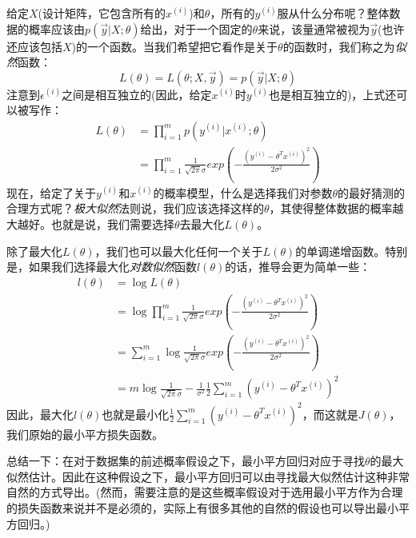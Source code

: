 给定$X$(设计矩阵，它包含所有的$x^{(i)}$)和$\theta$，所有的$y^{(i)}$服从什么分布呢？整体数据的概率应该由$p(\vec{y}|X;\theta)$给出，对于一个固定的$\theta$来说，该量通常被视为$\vec{y}$(也许还应该包括$X$)的一个函数。当我们希望把它看作是关于$\theta$的函数时，我们称之为\emph{似然}函数：
\begin{equation*}
L(\theta) = L(\theta;X,\vec{y}) = p(\vec{y}|X;\theta)
\end{equation*}
注意到$\epsilon^{(i)}$之间是相互独立的(因此，给定$x^{(i)}$时$y^{(i)}$也是相互独立的)，上式还可以被写作：
\begin{equation}
\begin{split}
L(\theta) &= \prod_{i = 1}^mp(y^{(i)}|x^{(i)};\theta) \\
&= \prod_{i = 1}^m\frac{1}{\sqrt{2\pi}\sigma}exp\left(-\frac{(y^{(i)} - \theta^Tx^{(i)})^2}{2\sigma^2}\right)
\end{split}
\end{equation}
现在，给定了关于$y^{(i)}$和$x^{(i)}$的概率模型，什么是选择我们对参数$\theta$的最好猜测的合理方式呢？\emph{极大似然}法则说，我们应该选择这样的$\theta$，其使得整体数据的概率越大越好。也就是说，我们需要选择$\theta$去最大化$L(\theta)$。

除了最大化$L(\theta)$，我们也可以最大化任何一个关于$L(\theta)$的单调递增函数。特别是，如果我们选择最大化\emph{对数似然}函数$l(\theta)$的话，推导会更为简单一些：
\begin{equation}
\begin{split}
l(\theta) &= \log{L(\theta)} \\
&= \log\prod_{i = 1}^m\frac{1}{\sqrt{2\pi}\sigma}exp\left(-\frac{(y^{(i)} - \theta^Tx^{(i)})^2}{2\sigma^2}\right) \\
&= \sum_{i = 1}^m\log\frac{1}{\sqrt{2\pi}\sigma}exp\left(-\frac{(y^{(i)} - \theta^Tx^{(i)})^2}{2\sigma^2}\right) \\
&= m\log\frac{1}{\sqrt{2\pi}\sigma} - \frac{1}{\sigma^2}\frac{1}{2}\sum_{i = 1}^m(y^{(i)} - \theta^Tx^{(i)})^2
\end{split}
\end{equation}
因此，最大化$l(\theta)$也就是最小化$\frac{1}{2}\sum_{i = 1}^m(y^{(i)} - \theta^Tx^{(i)})^2$，而这就是$J(\theta)$，我们原始的最小平方损失函数。

总结一下：在对于数据集的前述概率假设之下，最小平方回归对应于寻找$\theta$的最大似然估计。因此在这种假设之下，最小平方回归可以由寻找最大似然估计这种非常自然的方式导出。(然而，需要注意的是这些概率假设对于选用最小平方作为合理的损失函数来说并不是必须的，实际上有很多其他的自然的假设也可以导出最小平方回归。)

